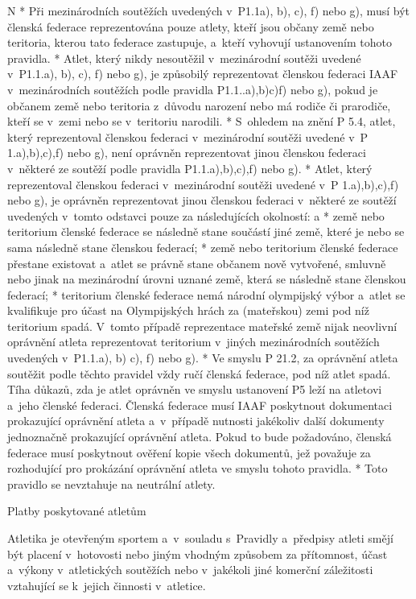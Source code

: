 \begitems \style N
* Při mezinárodních soutěžích uvedených v~P1.1a), b), c), f) nebo g), musí být členská federace reprezentována pouze atlety, kteří jsou občany země nebo teritoria, kterou tato federace zastupuje, a~kteří vyhovují ustanovením tohoto pravidla.
* Atlet, který nikdy nesoutěžil v~mezinárodní soutěži uvedené v~P1.1.a), b), c), f) nebo g), je způsobilý reprezentovat členskou federaci IAAF v~mezinárodních soutěžích podle pravidla P1.1..a),b)c)f) nebo g), pokud je občanem země nebo teritoria z~důvodu narození nebo má rodiče či prarodiče, kteří se v~zemi nebo se v~teritoriu narodili.
* S~ohledem na znění P 5.4, atlet, který reprezentoval členskou federaci v~mezinárodní soutěži uvedené v~P 1.a),b),c),f) nebo g), není oprávněn reprezentovat jinou členskou federaci v~některé ze soutěží podle pravidla P1.1.a),b),c),f) nebo g).
* Atlet, který reprezentoval členskou federaci v~mezinárodní soutěži uvedené v~P 1.a),b),c),f) nebo g), je oprávněn reprezentovat jinou členskou federaci v~některé ze soutěží uvedených v~tomto odstavci pouze za následujících okolností:
  \begitems \style a
  * země nebo teritorium členské federace se následně stane součástí jiné země, které je nebo se sama následně stane členskou federací;
  * země nebo teritorium členské federace přestane existovat a~atlet se právně stane občanem nově vytvořené, smluvně nebo jinak na mezinárodní úrovni uznané země, která se následně stane členskou federací;
  * teritorium členské federace nemá národní olympijský výbor a~atlet se kvalifikuje pro účast na Olympijských hrách za (mateřskou) zemi pod níž teritorium spadá. V~tomto případě reprezentace mateřské země nijak neovlivní oprávnění atleta reprezentovat teritorium v~jiných mezinárodních soutěžích uvedených v~P1.1.a), b) c), f) nebo g).
  \enditems
* Ve smyslu P 21.2, za oprávnění atleta soutěžit podle těchto pravidel vždy ručí členská federace, pod níž atlet spadá. Tíha důkazů, zda je atlet oprávněn ve smyslu ustanovení P5 leží na atletovi a~jeho členské federaci. Členská federace musí IAAF poskytnout dokumentaci prokazující oprávnění atleta a~v~případě nutnosti jakékoliv další dokumenty jednoznačně prokazující oprávnění atleta. Pokud to bude požadováno, členská federace musí poskytnout ověření kopie všech dokumentů, jež považuje za rozhodující pro prokázání oprávnění atleta ve smyslu tohoto pravidla.
* Toto pravidlo se nevztahuje na neutrální atlety.
\enditems

\secc Platby poskytované atletům

Atletika je otevřeným sportem a~v~souladu s~Pravidly a~předpisy atleti smějí být placení v~hotovosti nebo jiným vhodným způsobem za přítomnost, účast a~výkony v~atletických soutěžích nebo v~jakékoli jiné komerční záležitosti vztahující se k~jejich činnosti v~atletice.

